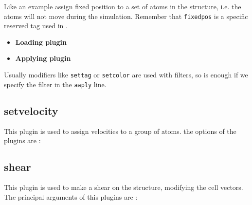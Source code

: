 
Like an example assign fixed position to a set of atoms in the structure, i.e.
the atoms will not move during the simulation. Remember that \verb|fixedpos| is
a specific reserved tag used in {\lpmd}.

\begin{itemize}
 \item \textbf{Loading plugin}
 \item \textbf{Applying plugin}
\end{itemize}

Usually modifiers like \verb|settag| or \verb|setcolor| are used with filters,
so is enough if we specify the filter in the \verb|aaply| line.

\subsection{setvelocity}
This plugin is used to assign velocities to a group of atoms. the options of
the plugins are :


\subsection{shear}
This plugin is used to make a shear on the structure, modifying the cell
vectors. The principal arguments of this plugins are :


